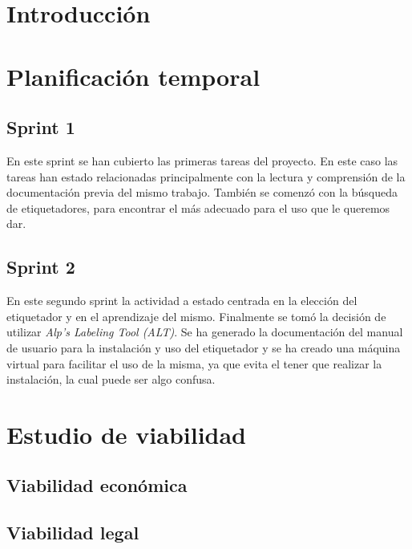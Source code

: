 
\section{Introducción}

\section{Planificación temporal}
\subsection{Sprint 1}
En este sprint se han cubierto las primeras tareas del proyecto. En este caso las tareas han estado relacionadas principalmente con la lectura y comprensión de la documentación previa del mismo trabajo.
También se comenzó con la búsqueda de etiquetadores, para encontrar el más adecuado para el uso que le queremos dar.
\subsection{Sprint 2}
En este segundo sprint la actividad a estado centrada en la elección del etiquetador y en el aprendizaje del mismo. Finalmente se tomó la decisión de utilizar \textit{Alp’s Labeling Tool (ALT)}. 
Se ha generado la documentación del manual de usuario para la instalación y uso del etiquetador y se ha creado una máquina virtual para facilitar el uso de la misma, ya que evita el tener que realizar la instalación, la cual puede ser algo confusa.

\section{Estudio de viabilidad}

\subsection{Viabilidad económica}

\subsection{Viabilidad legal}


